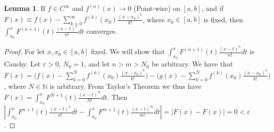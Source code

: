 \documentclass[oneside]{book}
\theoremstyle{definition}
\newtheorem{lemma}{Lemma}[section]
\begin{document}
\begin{lemma}
If $f\in C^{\infty}$ and $f^{(n)}(x)\rightarrow 0$ (Point-wise) on $[a,b]$, and if $F(x) \equiv f(x)-\sum_{k=0}^{\infty} f^{(k)}(x_0)\frac{(x-x_0)^{k}}{k!}$, where $x_0\in [a,b]$ is fixed, then $\int_{x_0}^{x} F^{(n+1)}(t)\frac{(x-t)^{n}}{n!}dt$ converges. 
\end{lemma}
\begin{proof}
For let $x,x_0\in [a,b]$ fixed. We will show that $\int_{x_0}^{x} F^{(n+1)}(t)\frac{(x-t)^{n}}{n!}dt$ is Cauchy. Let $\varepsilon>0$, $N_0 = 1$, and let $n>m>N_0$ be arbitrary. We have that $F(x) = \bigg(f(x)-\sum_{k=0}^{N} f^{(k)}(x_0)\frac{(x-x_0)^{k}}{k!}\bigg)-\bigg(g(x)-\sum_{k=0}^{N} f^{(k)}(x_0)\frac{(x-x_0)^{k}}{k!}\bigg)$, where $N\in \mathbb{N}$ is arbitrary. From Taylor's Theorem we thus have $F(x) = \int_{x_0}^{x}F^{N+1}(t)\frac{(x-t)^N}{N!}dt$. Then $|\int_{x_0}^{x}F^{n+1}(t)\frac{(x-t)^n}{n!}dt-\int_{x_0}^{x}F^{m+1}(t)\frac{(x-t)^m}{m!}dt| = |F(x)-F(x)|= 0 <\varepsilon$. 
\end{proof}
\end{document}
